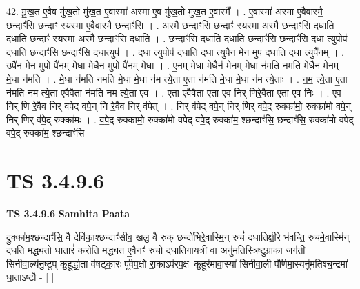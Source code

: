 \documentclass[17pt]{extarticle}
\begin{document}
42. मु॒ख॒त ए॒वैव मु॑ख॒तो मु॑ख॒त ए॒वास्मा॑ अस्मा ए॒व मु॑ख॒तो मु॑ख॒त ए॒वास्मै᳚ । . ए॒वास्मा॑ अस्मा ए॒वैवास्मै॒ छन्दाꣳ॑सि॒ छन्दाꣳ॑ स्यस्मा ए॒वैवास्मै॒ छन्दाꣳ॑सि । . अ॒स्मै॒ छन्दाꣳ॑सि॒ छन्दाꣳ॑ स्यस्मा अस्मै॒ छन्दाꣳ॑सि दधाति दधाति॒ छन्दाꣳ॑ स्यस्मा अस्मै॒ छन्दाꣳ॑सि दधाति । . छन्दाꣳ॑सि दधाति दधाति॒ छन्दाꣳ॑सि॒ छन्दाꣳ॑सि दधा॒ त्युपोप॑ दधाति॒ छन्दाꣳ॑सि॒ छन्दाꣳ॑सि दधा॒त्युप॑ । . द॒धा॒ त्युपोप॑ दधाति दधा॒ त्युपै॑न मेन॒ मुप॑ दधाति दधा॒ त्युपै॑नम् । . उपै॑न मेन॒ मुपो पै॑नम् मे॒धा मे॒धैन॒ मुपो पै॑नम् मे॒धा । . ए॒न॒म् मे॒धा मे॒धैन॑ मेनम् मे॒धा न॑मति नमति मे॒धैन॑ मेनम् मे॒धा न॑मति । . मे॒धा न॑मति नमति मे॒धा मे॒धा न॑म त्ये॒ता ए॒ता न॑मति मे॒धा मे॒धा न॑म त्ये॒ताः । . न॒म॒ त्ये॒ता ए॒ता न॑मति नम त्ये॒ता ए॒वैवैता न॑मति नम त्ये॒ता ए॒व । . ए॒ता ए॒वैवैता ए॒ता ए॒व निर् णिरे॒वैता ए॒ता ए॒व निः । . ए॒व निर् णि रे॒वैव निर् व॑पेद् वपे॒न् नि रे॒वैव निर् व॑पेत् । . निर् व॑पेद् वपे॒न् निर् णिर् व॑पे॒द् रुक्का॑मो॒ रुक्का॑मो वपे॒न् निर् णिर् व॑पे॒द् रुक्का॑मः । . व॒पे॒द् रुक्का॑मो॒ रुक्का॑मो वपेद् वपे॒द् रुक्का॑म॒ श्छन्दाꣳ॑सि॒ छन्दाꣳ॑सि॒ रुक्का॑मो वपेद् वपे॒द् रुक्का॑म॒ श्छन्दाꣳ॑सि । \newline
\pagebreak
{}

\section{ TS 3.4.9.6 }

\textbf{TS 3.4.9.6 } \newline
\textbf{Samhita Paata} \newline

द्रुक्का॑म॒श्छन्दाꣳ॑सि॒ वै देवि॑का॒श्छन्दाꣳ॑सीव॒ खलु॒ वै रुक् छन्दो॑भिरे॒वास्मि॒न् रुचं॑ दधातिक्षी॒रे भ॑वन्ति॒ रुच॑मे॒वास्मि॑न् दधति मद्ध्य॒तो धा॒तारं॑ करोति मद्ध्य॒त ए॒वैनꣳ॑ रु॒चो द॑धातिगाय॒त्री वा अनु॑मतिस्त्रि॒ष्टुग्रा॒का जग॑ती सिनीवा॒ल्य॑नु॒ष्टुप् कु॒हूर्द्धा॒ता व॑षट्का॒रः पू᳚र्वप॒क्षो रा॒काऽप॑रप॒क्षः कु॒हूर॑मावा॒स्या॑ सिनीवा॒ली पौ᳚र्णमा॒स्यनु॑मतिश्च॒न्द्रमा॑ धा॒ताऽष्टौ - [  ] \newline
\end{document}
